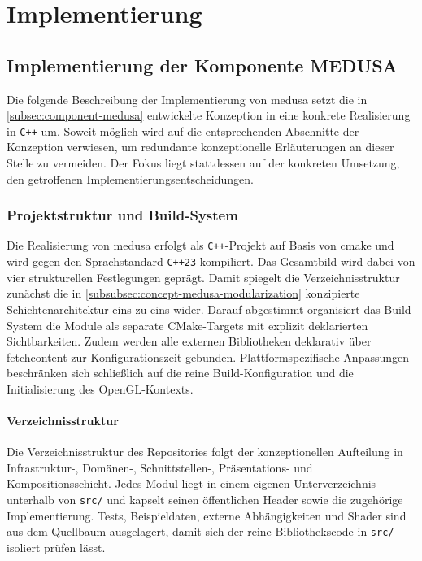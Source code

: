 \chapter{Implementierung}\label{chap:implementation}
    \section{Implementierung der Komponente MEDUSA}\label{sec:implementation-of-component-medusa}
        Die folgende Beschreibung der Implementierung von \ac{medusa} setzt die in \cref{subsec:component-medusa} entwickelte Konzeption in eine konkrete Realisierung in \texttt{C++} um.
        Soweit möglich wird auf die entsprechenden Abschnitte der Konzeption verwiesen, um redundante konzeptionelle Erläuterungen an dieser Stelle zu vermeiden.
        Der Fokus liegt stattdessen auf der konkreten Umsetzung, den getroffenen Implementierungsentscheidungen.

        \subsection{Projektstruktur und Build-System}\label{subsec:impl-medusa-project-structure} 
            Die Realisierung von \ac{medusa} erfolgt als \texttt{C++}-Projekt auf Basis von \gls{cmake} und wird gegen den Sprachstandard \texttt{C++23} kompiliert.
            Das Gesamtbild wird dabei von vier strukturellen Festlegungen geprägt.
            Damit spiegelt die Verzeichnisstruktur zunächst die in \cref{subsubsec:concept-medusa-modularization} konzipierte Schichtenarchitektur eins zu eins wider.
            Darauf abgestimmt organisiert das Build-System die Module als separate CMake-Targets mit explizit deklarierten Sichtbarkeiten.
            Zudem werden alle externen Bibliotheken deklarativ über \gls{fetchcontent} zur Konfigurationszeit gebunden.
            Plattformspezifische Anpassungen beschränken sich schließlich auf die reine Build-Konfiguration und die Initialisierung des \ac{OpenGL}-Kontexts.

            \subsubsection{Verzeichnisstruktur}\label{subsubsec:impl-medusa-directory-layout}
                Die Verzeichnisstruktur des Repositories folgt der konzeptionellen Aufteilung in Infrastruktur-, Domänen-, Schnittstellen-, Präsentations- und Kompositionsschicht.
                Jedes Modul liegt in einem eigenen Unterverzeichnis unterhalb von \texttt{src/} und kapselt seinen öffentlichen Header sowie die zugehörige Implementierung.
                Tests, Beispieldaten, externe Abhängigkeiten und Shader sind aus dem Quellbaum ausgelagert, damit sich der reine Bibliothekscode in \texttt{src/} isoliert prüfen lässt.

